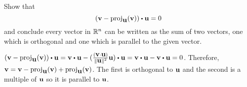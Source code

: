 \begin{ex} Show that
  \begin{equation*}
    (\vect{v}-\proj_{\vect{u}
      }(\vect{v})) \dotprod \vect{u}=0
  \end{equation*}
  and conclude every vector in $\mathbb{R}^{n}$ can be written as the sum of
  two vectors, one which is orthogonal and one which is parallel to
  the given vector.
  \begin{sol}
    $(\vect{v}-\proj_{\vect{u}}(\vect{v})) \dotprod
    \vect{u} = \vect{v} \dotprod \vect{u}
    -(\frac{(\vect{v}\cdot\vect{u}) }{\norm{\vect{u}}
        ^{2}}\vect{u}) \dotprod \vect{u} = \vect{v} \dotprod \vect{u}
    - \vect{v} \dotprod \vect{u} =0$. Therefore,
    $\vect{v} = \vect{v} - \proj_{\vect{u}}(\vect{v}) +
    \proj_{\vect{u}}(\vect{v})$. The first is orthogonal to
    $\mbox{\bf u}$ and the second is a multiple of $\mbox{\bf u}$ so it is
    parallel to $\mbox{\bf u}$.
  \end{sol}
\end{ex}

